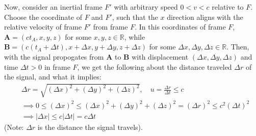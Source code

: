 \documentclass{article}
\newcommand{\RR}{\mathbb{R}}
\newcommand{\bA}{\textbf{A}}
\newcommand{\bB}{\textbf{B}}
\begin{document}
\begin{itemize}
    \hfil

    Now, consider an inertial frame $F'$ with arbitrary speed $0<v<c$ relative to $F$. Choose the coordinate of $F$ and $F'$, such that the $x$ direction aligns with the relative velocity of frame $F'$ from frame $F$. In this coordinates of frame $F$, $\bA=(ct_A, x,y,z)$ for some $x,y,z\in \RR$, while $\bB = (c(t_A+\Delta t),x+\Delta x,y+\Delta y,z+\Delta z)$ for some $\Delta x,\Delta y,\Delta z\in\RR$. Then, with the signal propogates from $\bA$ to $\bB$ with displacement $(\Delta x,\Delta y,\Delta z)$ and time $\Delta t>0$ in frame $F$, we get the following about the distance traveled $\Delta r$ of the signal, and what it implies:
    \begin{align}
        &\Delta r=\sqrt{(\Delta x)^2+(\Delta y)^2+(\Delta z)^2},\quad u = \frac{\Delta r}{\Delta t} \leq c\\
        &\implies 0\leq (\Delta x)^2\leq (\Delta x)^2+(\Delta y)^2 + (\Delta z)^2=(\Delta r)^2\leq c^2(\Delta t)^2\\
        &\implies |\Delta x|\leq c|\Delta t| = c\Delta t
    \end{align}
    (Note: $\Delta r$ is the distance the signal travels).


\end{itemize}
\end{document}

